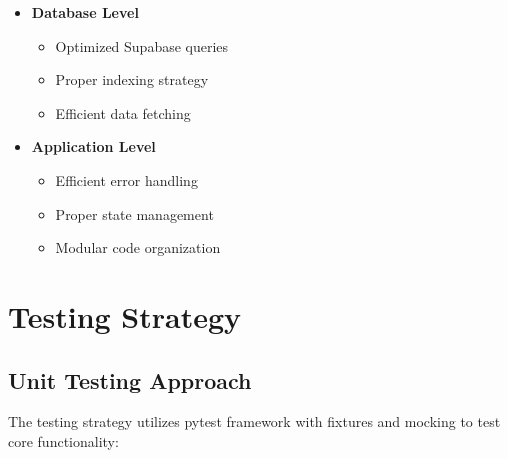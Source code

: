 \documentclass[12pt,a4paper]{article}
\begin{document}
\begin{itemize}
    \item \textbf{Database Level}
    \begin{itemize}
        \item Optimized Supabase queries
        \item Proper indexing strategy
        \item Efficient data fetching
    \end{itemize}
    
    \item \textbf{Application Level}
    \begin{itemize}
        \item Efficient error handling
        \item Proper state management
        \item Modular code organization
    \end{itemize}
\end{itemize}

\section{Testing Strategy}

\subsection{Unit Testing Approach}
The testing strategy utilizes pytest framework with fixtures and mocking to test core functionality:
\end{document}
